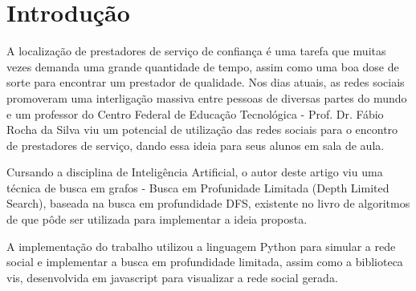 


\section{Introdução}\label{sec:introducao}



A localização de prestadores de serviço de confiança é uma tarefa que muitas vezes demanda uma grande quantidade de tempo, assim como uma boa dose de sorte para encontrar um prestador de qualidade. Nos dias atuais, as redes sociais promoveram uma interligação massiva entre pessoas de diversas partes do mundo e um professor do Centro Federal de Educação Tecnológica - Prof. Dr. Fábio Rocha da Silva viu um potencial de utilização das redes sociais para o encontro de prestadores de serviço, dando essa ideia para seus alunos em sala de aula.

Cursando a disciplina de Inteligência Artificial, o autor deste artigo viu uma técnica de busca em grafos - Busca em Profunidade Limitada (Depth Limited Search), baseada na busca em profundidade DFS, existente no livro de algoritmos de  que pôde ser utilizada para implementar a ideia proposta.

A implementação do trabalho utilizou a linguagem Python para simular a rede social e implementar a busca em profundidade limitada, assim como a biblioteca vis, desenvolvida em javascript para visualizar a rede social gerada.
